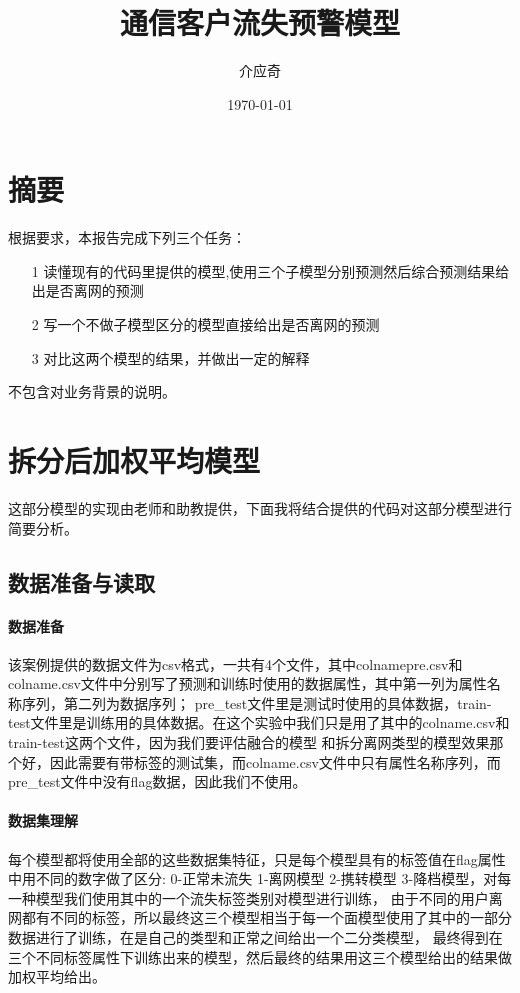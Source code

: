 \documentclass{article}
\begin{document}
\title{通信客户流失预警模型}
\author{介应奇}
\date{\today}
\maketitle
\tableofcontents

\section{摘要}
根据要求，本报告完成下列三个任务：
\begin{itemize}
  \item [1] 
	读懂现有的代码里提供的模型,使用三个子模型分别预测然后综合预测结果给出是否离网的预测
  \item [2]
	写一个不做子模型区分的模型直接给出是否离网的预测
  \item [3]
	对比这两个模型的结果，并做出一定的解释
\end{itemize}

不包含对业务背景的说明。

\section{拆分后加权平均模型}
这部分模型的实现由老师和助教提供，下面我将结合提供的代码对这部分模型进行简要分析。

\subsection{数据准备与读取}

\paragraph{数据准备}

该案例提供的数据文件为csv格式，一共有4个文件，其中colname\-pre.csv和colname.csv文件中分别写了预测和训练时使用的数据属性，其中第一列为属性名称序列，第二列为数据序列； 
pre\_test文件里是测试时使用的具体数据，train-test文件里是训练用的具体数据。在这个实验中我们只是用了其中的colname.csv和train-test这两个文件，因为我们要评估融合的模型
和拆分离网类型的模型效果那个好，因此需要有带标签的测试集，而colname.csv文件中只有属性名称序列，而pre\_test文件中没有flag数据，因此我们不使用。

\paragraph{数据集理解}
每个模型都将使用全部的这些数据集特征，只是每个模型具有的标签值在flag属性中用不同的数字做了区分:
0-正常未流失  1-离网模型  2-携转模型  3-降档模型，对每一种模型我们使用其中的一个流失标签类别对模型进行训练，
由于不同的用户离网都有不同的标签，所以最终这三个模型相当于每一个面模型使用了其中的一部分数据进行了训练，在是自己的类型和正常之间给出一个二分类模型，
最终得到在三个不同标签属性下训练出来的模型，然后最终的结果用这三个模型给出的结果做加权平均给出。
\end{document}
